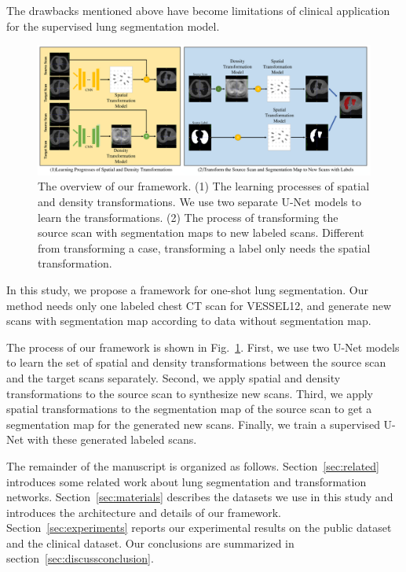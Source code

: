 \documentclass{article}
\begin{document}
The drawbacks mentioned above have become limitations of clinical application for the supervised lung segmentation model.


\begin{figure}[htbp]
    \centerline{\includegraphics[width=180mm]{transarti2.pdf}}
    \vspace{-0cm}
    \caption{The overview of our framework. (1) The learning processes of spatial and density transformations. We use two separate U-Net models to learn the transformations. (2) The process of transforming the source scan with segmentation maps to new labeled scans. Different from transforming a case, transforming a label only needs the spatial transformation.
    }
    \vspace{-0cm}
    \label{transarti}
    \end{figure}


In this study, we propose a framework for one-shot lung segmentation. Our method needs only one labeled chest CT scan for VESSEL12, and generate new scans with segmentation map according to data without segmentation map.

The process of our framework is shown in Fig.~\ref{transarti}.
First, we use two U-Net models to learn the set of spatial and density transformations between the source scan and the target scans separately. Second, we apply spatial and density transformations to the source scan to synthesize new scans. Third, we apply spatial transformations to the segmentation map of the source scan to get a segmentation map for the generated new scans. Finally, we train a supervised U-Net with these generated labeled scans.

The remainder of the manuscript is organized as follows. 
Section~\ref{sec:related} introduces some related work about lung segmentation and transformation networks.
Section~\ref{sec:materials} describes the datasets we use in this study and introduces the architecture and details of our framework.
Section~\ref{sec:experiments} reports our experimental results on the public dataset and the clinical dataset.
Our conclusions are summarized in section~\ref{sec:discussconclusion}.
\end{document}
